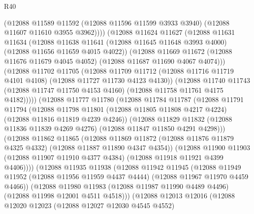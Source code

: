\begin{lexlean}{R40}
\begin{coremodule}
              (@12088
                @11589
                @11592
                (@12088 @11596 @11599 @3933 @3940)
                (@12088 @11607 @11610 @3955 @3962))))
          (@12088
            @11624
            @11627
            (@12088
              @11631
              @11634
              (@12088
                @11638
                @11641
                (@12088 @11645 @11648 @3993 @4000)
                (@12088 @11656 @11659 @4015 @4022))
              (@12088
                @11669
                @11672
                (@12088 @11676 @11679 @4045 @4052)
                (@12088 @11687 @11690 @4067 @4074)))
            (@12088
              @11702
              @11705
              (@12088
                @11709
                @11712
                (@12088 @11716 @11719 @4101 @4108)
                (@12088 @11727 @11730 @4123 @4130))
              (@12088
                @11740
                @11743
                (@12088 @11747 @11750 @4153 @4160)
                (@12088 @11758 @11761 @4175 @4182)))))
        (@12088
          @11777
          @11780
          (@12088
            @11784
            @11787
            (@12088
              @11791
              @11794
              (@12088
                @11798
                @11801
                (@12088 @11805 @11808 @4217 @4224)
                (@12088 @11816 @11819 @4239 @4246))
              (@12088
                @11829
                @11832
                (@12088 @11836 @11839 @4269 @4276)
                (@12088 @11847 @11850 @4291 @4298)))
            (@12088
              @11862
              @11865
              (@12088
                @11869
                @11872
                (@12088 @11876 @11879 @4325 @4332)
                (@12088 @11887 @11890 @4347 @4354))
              (@12088
                @11900
                @11903
                (@12088 @11907 @11910 @4377 @4384)
                (@12088 @11918 @11921 @4399 @4406))))
          (@12088
            @11935
            @11938
            (@12088
              @11942
              @11945
              (@12088
                @11949
                @11952
                (@12088 @11956 @11959 @4437 @4444)
                (@12088 @11967 @11970 @4459 @4466))
              (@12088
                @11980
                @11983
                (@12088 @11987 @11990 @4489 @4496)
                (@12088 @11998 @12001 @4511 @4518)))
            (@12088
              @12013
              @12016
              (@12088
                @12020
                @12023
                (@12088 @12027 @12030 @4545 @4552)

\end{coremodule}
\end{lexlean}
